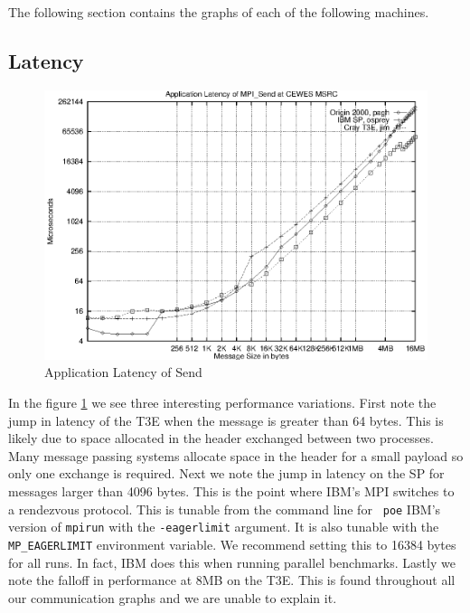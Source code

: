 \documentclass [12pt]{article}
\begin{document}
The following section contains the graphs of each of the following machines.

\subsection{Latency}
\begin{figure}[Hht]
\centerline{\includegraphics{pics/cewes_mpi_latency.ps}}
\caption{Application Latency of Send}\label{latency}
\end{figure}

In the figure \ref{latency} we see three interesting performance
variations. First note the jump in latency of the T3E when the message
is greater than 64 bytes. This is likely due to space allocated in the
header exchanged between two processes. Many message passing systems
allocate space in the header for a small payload so only one exchange
is required. Next we note the jump in latency on the SP for messages
larger than 4096 bytes. This is the point where IBM's MPI switches to
a rendezvous protocol. This is tunable from the command line for {\tt
poe} IBM's version of {\tt mpirun} with the {\tt -eagerlimit}
argument. It is also tunable with the {\tt MP\_EAGERLIMIT} environment
variable. We recommend setting this to 16384 bytes for all runs. In
fact, IBM does this when running parallel benchmarks. Lastly we note
the falloff in performance at 8MB on the T3E. This is found throughout
all our communication graphs and we are unable to explain it.

\clearpage
\newpage
\end{document}
